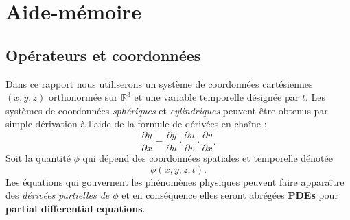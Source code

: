 \chapter{Aide-mémoire}

\section{Opérateurs et coordonnées}
Dans ce rapport nous utiliserons un système de coordonnées cartésiennes $(x, y, z)$ orthonormée sur $\mathbb{R}^3$ et une variable temporelle désignée par $t$. Les systèmes de coordonnées \textit{sphériques} et \textit{cylindriques} peuvent être obtenus par simple dérivation à l'aide de la formule de dérivées en chaîne : 
\begin{equation}
	\frac{\partial y}{\partial x} = \frac{\partial y}{\partial u}\cdot\frac{\partial u}{\partial v}\cdot\frac{\partial v}{\partial x}.\label{op:chainder}
\end{equation}
Soit la quantité $\phi$ qui dépend des coordonnées spatiales et temporelle dénotée \[\phi (x, y, z, t).\]
Les équations qui gouvernent les phénomènes physiques peuvent faire apparaître des \textit{dérivées partielles de $\phi$} et en conséquence elles seront abrégées \textbf{PDEs} pour \textbf{partial differential equations}.\\

